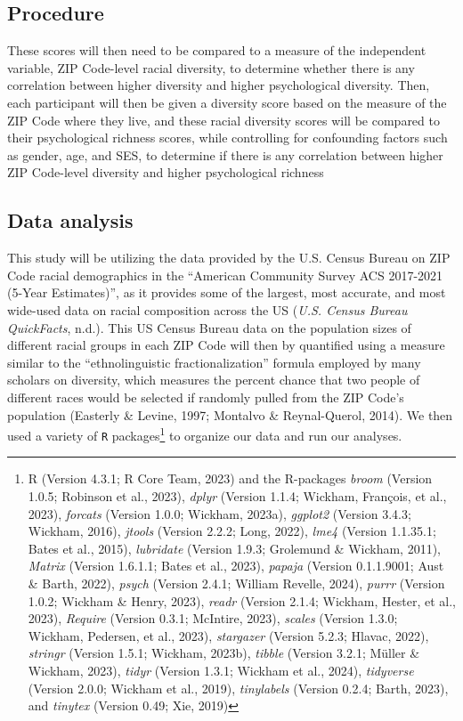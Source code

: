 \documentclass[
  man,floatsintext]{apa7}
\begin{document}
\hypertarget{procedure}{%
\subsection{Procedure}\label{procedure}}

These scores will then need to be compared to a measure of the independent variable, ZIP Code-level racial diversity, to determine whether there is any correlation between higher diversity and higher psychological diversity. Then, each participant will then be given a diversity score based on the measure of the ZIP Code where they live, and these racial diversity scores will be compared to their psychological richness scores, while controlling for confounding factors such as gender, age, and SES, to determine if there is any correlation between higher ZIP Code-level diversity and higher psychological richness

\hypertarget{data-analysis}{%
\subsection{Data analysis}\label{data-analysis}}

This study will be utilizing the data provided by the U.S. Census Bureau on ZIP Code racial demographics in the ``American Community Survey ACS 2017-2021 (5-Year Estimates)'', as it provides some of the largest, most accurate, and most wide-used data on racial composition across the US (\emph{U.{S}. {Census Bureau QuickFacts}}, n.d.). This US Census Bureau data on the population sizes of different racial groups in each ZIP Code will then by quantified using a measure similar to the ``ethnolinguistic fractionalization'' formula employed by many scholars on diversity, which measures the percent chance that two people of different races would be selected if randomly pulled from the ZIP Code's population (Easterly \& Levine, 1997; Montalvo \& Reynal-Querol, 2014). We then used a variety of \texttt{R} packages\footnote{R (Version 4.3.1; R Core Team, 2023) and the R-packages \emph{broom} (Version 1.0.5; Robinson et al., 2023), \emph{dplyr} (Version 1.1.4; Wickham, François, et al., 2023), \emph{forcats} (Version 1.0.0; Wickham, 2023a), \emph{ggplot2} (Version 3.4.3; Wickham, 2016), \emph{jtools} (Version 2.2.2; Long, 2022), \emph{lme4} (Version 1.1.35.1; Bates et al., 2015), \emph{lubridate} (Version 1.9.3; Grolemund \& Wickham, 2011), \emph{Matrix} (Version 1.6.1.1; Bates et al., 2023), \emph{papaja} (Version 0.1.1.9001; Aust \& Barth, 2022), \emph{psych} (Version 2.4.1; William Revelle, 2024), \emph{purrr} (Version 1.0.2; Wickham \& Henry, 2023), \emph{readr} (Version 2.1.4; Wickham, Hester, et al., 2023), \emph{Require} (Version 0.3.1; McIntire, 2023), \emph{scales} (Version 1.3.0; Wickham, Pedersen, et al., 2023), \emph{stargazer} (Version 5.2.3; Hlavac, 2022), \emph{stringr} (Version 1.5.1; Wickham, 2023b), \emph{tibble} (Version 3.2.1; Müller \& Wickham, 2023), \emph{tidyr} (Version 1.3.1; Wickham et al., 2024), \emph{tidyverse} (Version 2.0.0; Wickham et al., 2019), \emph{tinylabels} (Version 0.2.4; Barth, 2023), and \emph{tinytex} (Version 0.49; Xie, 2019)} to organize our data and run our analyses.
\end{document}
